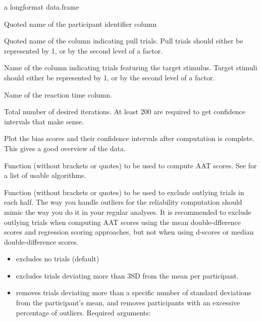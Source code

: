 \documentclass[a4paper]{book}
\begin{document}
%
\begin{Arguments}
\begin{ldescription}
\item[\code{ds}] a longformat data.frame

\item[\code{subjvar}] Quoted name of the participant identifier column

\item[\code{pullvar}] Quoted name of the column indicating pull trials.
Pull trials should either be represented by 1, or by the second level of a factor.

\item[\code{targetvar}] Name of the column indicating trials featuring the target stimulus.
Target stimuli should either be represented by 1, or by the second level of a factor.

\item[\code{rtvar}] Name of the reaction time column.

\item[\code{iters}] Total number of desired iterations. At least 200 are required to get confidence intervals that make sense.

\item[\code{plot}] Plot the bias scores and their confidence intervals after computation is complete. This gives a good overview of the data.

\item[\code{algorithm}] Function (without brackets or quotes) to be used to compute AAT scores. See  for a list of usable algorithms.

\item[\code{trialdropfunc}] Function (without brackets or quotes) to be used to exclude outlying trials in each half.
The way you handle outliers for the reliability computation should mimic the way you do it in your regular analyses.
It is recommended to exclude outlying trials when computing AAT scores using the mean double-dfference scores and regression scoring approaches,
but not when using d-scores or median double-difference scores.
\begin{itemize}

\item{}  excludes no trials (default)
\item{}  excludes trials deviating more than 3SD from the mean per participant.
\item{}  removes trials deviating more than a specific number of standard deviations from the participant's mean,
and removes participants with an excessive percentage of outliers.
Required arguments:
\begin{itemize}


\end{itemize}
\end{itemize}
\end{ldescription}
\end{Arguments}
\end{document}
